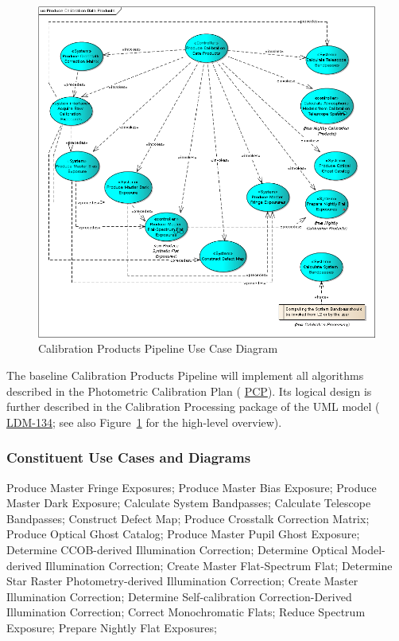 \documentclass[12pt]{article}
\newcommand{\ds}[2]{{\color{blue} \href{https://docushare.lsstcorp.org/docushare/dsweb/Get/#1}{#2}}\xspace}
\newcommand{\appsUML}{\ds{LDM-134}{LDM-134}}
\newcommand{\PCP}{\ds{Document-8123}{PCP}}
\begin{document}
\begin{figure}
\includegraphics[angle=0,scale=0.44]{produce_calibration_data_products.png}
\caption{Calibration Products Pipeline Use Case Diagram\label{fig:cppUML}}
\end{figure}

The baseline Calibration Products Pipeline will implement all algorithms described in the Photometric Calibration Plan (\PCP). Its logical design is further described in the Calibration Processing package of the UML model (\appsUML; see also Figure~\ref{fig:cppUML} for the high-level overview).

\subsubsection{Constituent Use Cases and Diagrams}

Produce Master Fringe Exposures;
Produce Master Bias Exposure;
Produce Master Dark Exposure;
Calculate System Bandpasses;
Calculate Telescope Bandpasses;
Construct Defect Map;
Produce Crosstalk Correction Matrix;
Produce Optical Ghost Catalog;
Produce Master Pupil Ghost Exposure;
Determine CCOB-derived Illumination Correction;
Determine Optical Model-derived Illumination Correction;
Create Master Flat-Spectrum Flat;
Determine Star Raster Photometry-derived Illumination Correction;
Create Master Illumination Correction;
Determine Self-calibration Correction-Derived Illumination Correction;
Correct Monochromatic Flats;
Reduce Spectrum Exposure;
Prepare Nightly Flat Exposures;
\end{document}

